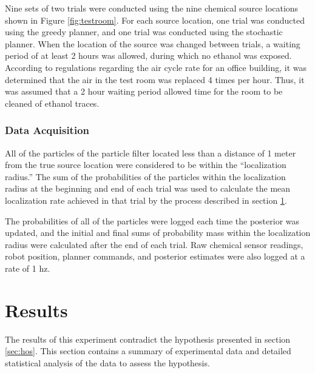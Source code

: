 \documentclass[submit, 12pt]{aiaa-pretty-modified}
\begin{document}
Nine sets of two trials were conducted using the nine chemical source
locations shown in Figure \ref{fig:testroom}.  For each source
location, one trial was conducted using the greedy planner, and one trial
was conducted using the stochastic planner.  When the location of the source was changed between trials, a waiting period of at least 2 hours
was allowed, during which no ethanol was exposed. According to regulations regarding the air
cycle rate for an office building, it was determined that the air in
the test room was replaced 4 times per hour.  Thus, it was assumed that a 2 hour waiting
period allowed time for the room to be cleaned of ethanol traces.

\subsubsection{Data Acquisition}
All of the particles of the particle filter located less than a distance of 1 meter from the
true source location were considered to be within the ``localization
radius.''  The sum of the probabilities of the particles within the
localization radius at the beginning and end of each trial was used to
calculate the mean localization rate achieved in that trial by the
process described in section \ref{sec:results}.

The probabilities of all of the particles were logged each time the
posterior was updated, and the initial and final sums of probability
mass within the localization radius were calculated after the
end of each trial. Raw chemical sensor readings, robot position, planner commands, and
posterior estimates were also logged at a rate of 1 hz.

\newpage

\section{Results}
\label{sec:results}
The results of this experiment contradict the hypothesis presented in
section \ref{sec:hos}.  This section contains  a summary of experimental data
and detailed statistical analysis of the data to assess the
hypothesis.
\end{document}

